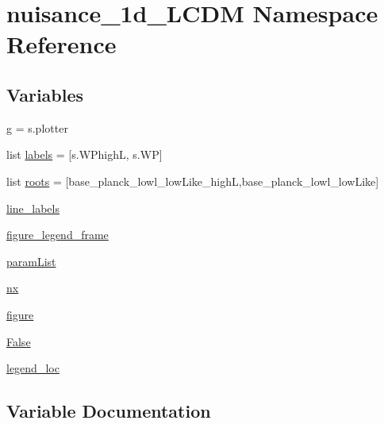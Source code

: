 \hypertarget{namespacenuisance__1d__LCDM}{}\section{nuisance\+\_\+1d\+\_\+\+L\+C\+DM Namespace Reference}
\label{namespacenuisance__1d__LCDM}
\subsection*{Variables}
\begin{DoxyCompactItemize}
\item 
\mbox{\hyperlink{namespacenuisance__1d__LCDM_a134dc4b925f05dcde2f3e79d010dd87d}{g}} = s.\+plotter
\item 
list \mbox{\hyperlink{namespacenuisance__1d__LCDM_abad509752546ebab6a6a368fc499de41}{labels}} = \mbox{[}s.\+W\+PhighL, s.\+WP\mbox{]}
\item 
list \mbox{\hyperlink{namespacenuisance__1d__LCDM_a5322ee84f0b723ad8281dbb86bcd3b40}{roots}} = \mbox{[}\textquotesingle{}base\+\_\+planck\+\_\+lowl\+\_\+low\+Like\+\_\+highL\textquotesingle{},\textquotesingle{}base\+\_\+planck\+\_\+lowl\+\_\+low\+Like\textquotesingle{}\mbox{]}
\item 
\mbox{\hyperlink{namespacenuisance__1d__LCDM_ae213b012cfb50b3b250835a48b1748d2}{line\+\_\+labels}}
\item 
\mbox{\hyperlink{namespacenuisance__1d__LCDM_afac421497ebae9477872bb8b3e6cafdc}{figure\+\_\+legend\+\_\+frame}}
\item 
\mbox{\hyperlink{namespacenuisance__1d__LCDM_a18beda6d6cb3f8768b3e50372c1a86e2}{param\+List}}
\item 
\mbox{\hyperlink{namespacenuisance__1d__LCDM_aab4054183caa286dcb38ae56eeffddfd}{nx}}
\item 
\mbox{\hyperlink{namespacenuisance__1d__LCDM_a9f18f71fd0b4a7fd8a2c92e581bdcfe9}{figure}}
\item 
\mbox{\hyperlink{namespacenuisance__1d__LCDM_ac0b64d192ff3fbc765f7b4236a3484ff}{False}}
\item 
\mbox{\hyperlink{namespacenuisance__1d__LCDM_a35d90508e87b1f4e10ab9f2d72ff3725}{legend\+\_\+loc}}
\end{DoxyCompactItemize}


\subsection{Variable Documentation}
\mbox{\label{namespacenuisance__1d__LCDM_ac0b64d192ff3fbc765f7b4236a3484ff}} 
